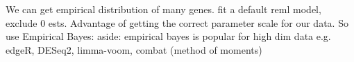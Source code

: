 We can get empirical distribution of many genes.
    fit a default reml model, exclude 0 ests.
Advantage of getting the correct parameter scale for our data.
So use Empirical Bayes:
    aside: empirical bayes is popular for high dim data e.g. edgeR, DESeq2, limma-voom, combat (method of moments)

